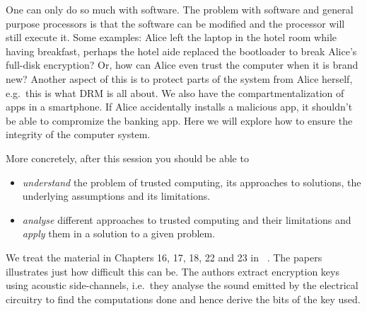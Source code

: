 One can only do so much with software.
The problem with software and general purpose processors is that the software 
can be modified and the processor will still execute it.
Some examples: Alice left the laptop in the hotel room while having breakfast, 
perhaps the hotel aide replaced the bootloader to break Alice's full-disk 
encryption?
Or, how can Alice even trust the computer when it is brand new?
Another aspect of this is to protect parts of the system from Alice herself, 
e.g.\ this is what \ac{DRM} is all about.
We also have the compartmentalization of apps in a smartphone.
If Alice accidentally installs a malicious app, it shouldn't be able to 
compromize the banking app.
Here we will explore how to ensure the integrity of the computer system.

More concretely, after this session you should be able to
\begin{itemize}
  \item \emph{understand} the problem of trusted computing, its approaches to 
    solutions, the underlying assumptions and its limitations.
  \item \emph{analyse} different approaches to trusted computing and their 
    limitations and \emph{apply} them in a solution to a given problem.
\end{itemize}

We treat the material in Chapters 16, 17, 18, 22 and 23 in 
~\cite{Anderson2008sea}.
The papers~\cite{%
  VoltageKeyExtraction,AcousticKeyExtraction,ElectromagneticKeyExtraction%
} illustrates just how difficult this can be.
The authors extract encryption keys using acoustic side-channels, i.e.\ they 
analyse the sound emitted by the electrical circuitry to find the computations 
done and hence derive the bits of the key used.


